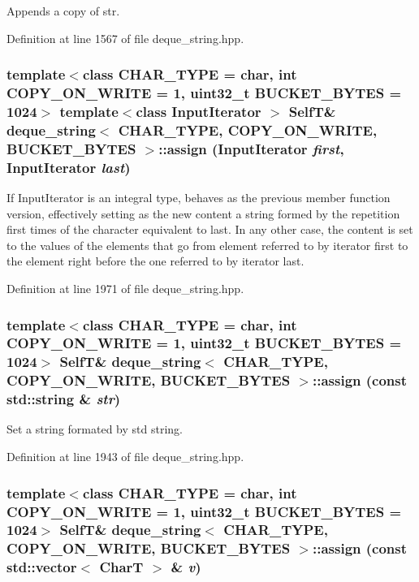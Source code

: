 Appends a copy of str. 

Definition at line 1567 of file deque\_\-string.hpp.\hypertarget{classdeque__string_c5b8af527d69203338e2450164dbdd8c}{
\subsubsection[{assign}]{\setlength{\rightskip}{0pt plus 5cm}template$<$class CHAR\_\-TYPE  = char, int COPY\_\-ON\_\-WRITE = 1, uint32\_\-t BUCKET\_\-BYTES = 1024$>$ template$<$class InputIterator $>$ {\bf SelfT}\& {\bf deque\_\-string}$<$ CHAR\_\-TYPE, COPY\_\-ON\_\-WRITE, BUCKET\_\-BYTES $>$::assign (InputIterator {\em first}, \/  InputIterator {\em last})}}
\label{classdeque__string_c5b8af527d69203338e2450164dbdd8c}


If InputIterator is an integral type, behaves as the previous member function version, effectively setting as the new content a string formed by the repetition first times of the character equivalent to last. In any other case, the content is set to the values of the elements that go from element referred to by iterator first to the element right before the one referred to by iterator last. 

Definition at line 1971 of file deque\_\-string.hpp.\hypertarget{classdeque__string_70d8b09a7c215edb6cf46bb75c6a0302}{
\subsubsection[{assign}]{\setlength{\rightskip}{0pt plus 5cm}template$<$class CHAR\_\-TYPE  = char, int COPY\_\-ON\_\-WRITE = 1, uint32\_\-t BUCKET\_\-BYTES = 1024$>$ {\bf SelfT}\& {\bf deque\_\-string}$<$ CHAR\_\-TYPE, COPY\_\-ON\_\-WRITE, BUCKET\_\-BYTES $>$::assign (const std::string \& {\em str})}}
\label{classdeque__string_70d8b09a7c215edb6cf46bb75c6a0302}


Set a string formated by std string. 

Definition at line 1943 of file deque\_\-string.hpp.\hypertarget{classdeque__string_66230e3dcfe245f877558ffe0fce711a}{
\subsubsection[{assign}]{\setlength{\rightskip}{0pt plus 5cm}template$<$class CHAR\_\-TYPE  = char, int COPY\_\-ON\_\-WRITE = 1, uint32\_\-t BUCKET\_\-BYTES = 1024$>$ {\bf SelfT}\& {\bf deque\_\-string}$<$ CHAR\_\-TYPE, COPY\_\-ON\_\-WRITE, BUCKET\_\-BYTES $>$::assign (const std::vector$<$ CharT $>$ \& {\em v})}}
\label{classdeque__string_66230e3dcfe245f877558ffe0fce711a}


